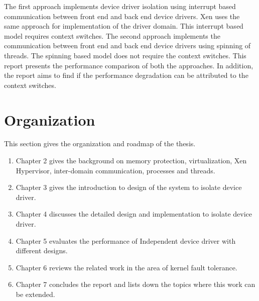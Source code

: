 The first approach implements device driver isolation using interrupt based communication between front end and back end device drivers. Xen uses the same approach for implementation of the driver domain\cite{driverdomain}. This interrupt based model requires context switches\cite{Barham:2003:XAV:945445.945462}. The second approach implements the communication between front end and back end device drivers using spinning of threads. The spinning based model does not require the context switches. This report presents the performance comparison of both the approaches. In addition, the report aims to find if the performance degradation can be attributed to the context switches.

\pagebreak
\section {Organization}

This section gives the organization and roadmap of the thesis.

\begin{enumerate}
\item Chapter 2 gives the background on memory protection, virtualization, Xen Hypervisor, inter-domain communication, processes and threads. 
\item Chapter 3 gives the introduction to design of the system to isolate device driver. 
\item Chapter 4 discusses the detailed design and implementation to isolate device driver. 
\item Chapter 5 evaluates the performance of Independent device driver with different designs.
\item Chapter 6 reviews the related work in the area of kernel fault tolerance.
\item Chapter 7 concludes the report and lists down the topics where this work can be extended.
\end{enumerate}

